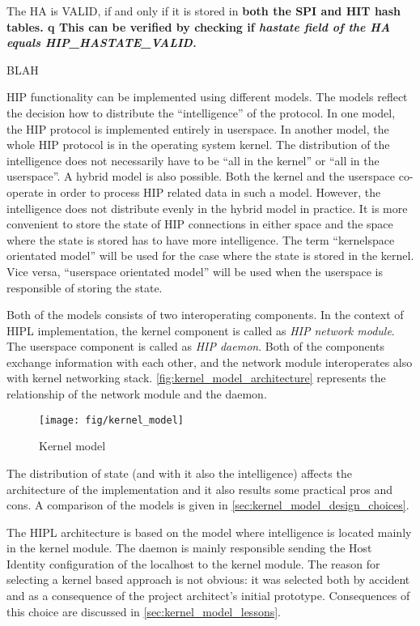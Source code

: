 The HA is VALID, if and only if it is stored in \bf{both} the SPI and HIT hash
tables. q This can be verified by checking if \em{hastate field of the HA equals
  HIP\_HASTATE\_VALID}.


{\large BLAH}


HIP functionality can be implemented using different models. The
models reflect the decision how to distribute the ``intelligence''
of the protocol. In one model, the HIP protocol is implemented
entirely in userspace. In another model, the whole HIP protocol is
in the operating system kernel. 
The distribution of the intelligence does not necessarily have to be
``all in the kernel'' or ``all in the userspace''. A hybrid model is
also possible. Both the kernel and the userspace co-operate in order
to process HIP related data in such a model. However, the intelligence
does not distribute evenly in the hybrid model in practice. It is more
convenient to store the state of HIP connections in either space and
the space where the state is stored has to have more intelligence. The
term ``kernelspace orientated model'' will be used for the case where
the state is stored in the kernel. Vice versa, ``userspace orientated
model'' will be used when the userspace is responsible of storing the
state.

Both of the models consists of two interoperating components. In the
context of HIPL implementation, the kernel component is called as
\textit{HIP network module}. The userspace component is called as
\textit{HIP daemon}. Both of the components exchange information with
each other, and the network module interoperates also with kernel
networking stack. \autoref{fig:kernel_model_architecture} represents
the relationship of the network module and the daemon.

\begin{figure}[hbt]
 \centering
 \texttt{[image: fig/kernel\_model]}
 \caption{Kernel model}
 \label{fig:kernel_model_architecture}
\end{figure}

The distribution of state (and with it also the intelligence) affects
the architecture of the implementation and it also results some
practical pros and cons. A comparison of the models is given in
\autoref{sec:kernel_model_design_choices}.

The HIPL architecture is based on the model where intelligence is
located mainly in the kernel module. The daemon is mainly responsible
sending the Host Identity configuration of the localhost to the kernel
module. The reason for selecting a kernel based approach is not
obvious: it was selected both by accident and as a consequence of the
project architect's initial prototype. Consequences of this choice are
discussed in \autoref{sec:kernel_model_lessons}.

